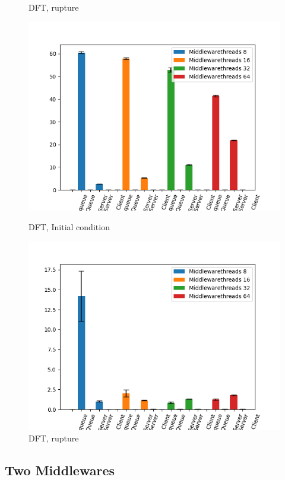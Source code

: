 \documentclass[11pt,a4paper]{article}
\begin{document}
\begin{figure}[!ht]
\begin{minipage}[b]{0.5\linewidth}
    \caption{DFT, rupture} 
    \vspace{4ex}
  \end{minipage} 
    \begin{minipage}[b]{0.5\linewidth}
    \centering
    \includegraphics[width=0.7\linewidth]{img/exp3_1/exp3_1_mw_percentile_plots_writes_0__vc_32.png} 
    \caption{DFT, Initial condition} 
    \vspace{4ex}
  \end{minipage}%
  \begin{minipage}[b]{0.5\linewidth}
    \centering
    \includegraphics[width=0.7\linewidth]{img/exp3_1/exp3_1_mw_percentile_plots_writes_1__vc_32.png} 
    \caption{DFT, rupture} 
    \vspace{4ex}
  \end{minipage} 
\end{figure}

\subsection{Two Middlewares}
\end{document}
